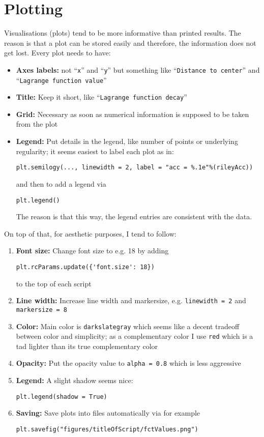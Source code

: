 \documentclass[11pt]{article}
\begin{document}
\section{Plotting}

Visualisations (plots) tend to be more informative than printed results. The reason is that a plot can be stored easily and therefore, the information does not get lost. Every plot needs to have:
\begin{itemize}
\item \textbf{Axes labels:} not ``\texttt{x}'' and ``\texttt{y}'' but something like ``\texttt{Distance to center}'' and ``\texttt{Lagrange function value}''
\item \textbf{Title:} Keep it short, like ``\texttt{Lagrange function decay}''
\item \textbf{Grid:} Necessary as soon as numerical information is supposed to be taken from the plot
\item \textbf{Legend:} Put details in the legend, like number of points or underlying regularity; it seems easiest to label each plot as in:
\begin{Verbatim}[formatcom=\color{blue!50!black}]
plt.semilogy(..., linewidth = 2, label = "acc = %.1e"%(rileyAcc))
\end{Verbatim}
and then to add a legend via
\begin{Verbatim}[formatcom=\color{blue!50!black}]
plt.legend()
\end{Verbatim}
The reason is that this way, the legend entries are consistent with the data.
\end{itemize}
On top of that, for aesthetic purposes, I tend to follow:
\begin{enumerate}
\item \textbf{Font size:} Change font size to e.g. 18 by adding
\begin{Verbatim}[formatcom=\color{blue!50!black}]
plt.rcParams.update({'font.size': 18})
\end{Verbatim}
to the top of each script
\item \textbf{Line width:} Increase line width and markersize, e.g. \verb+linewidth = 2+ and \verb+markersize = 8+
\item \textbf{Color:} Main color is \texttt{darkslategray} which seems like a decent tradeoff between color and simplicity; as a complementary color I use \texttt{red} which is a tad lighter than its true complementary color
\item \textbf{Opacity:} Put the opacity value to \verb+alpha = 0.8+ which is less aggressive
\item \textbf{Legend:} A slight shadow seems nice:
\begin{Verbatim}[formatcom=\color{blue!50!black}]
plt.legend(shadow = True)
\end{Verbatim}
\item \textbf{Saving:} Save plots into files automatically via for example
\begin{Verbatim}[formatcom=\color{blue!50!black}]
plt.savefig("figures/titleOfScript/fctValues.png")
\end{Verbatim}

\end{enumerate}
\end{document}
